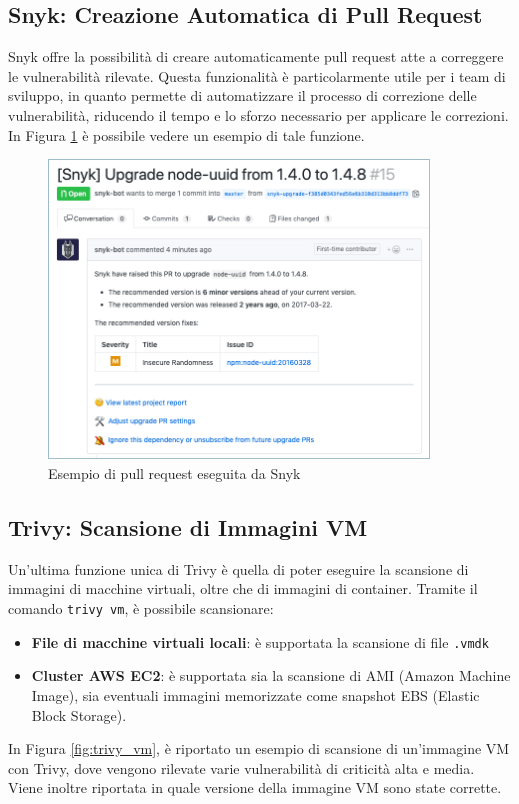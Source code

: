 \subsection{Snyk: Creazione Automatica di Pull Request}
Snyk offre la possibilità di creare automaticamente pull request atte a correggere le vulnerabilità rilevate. Questa funzionalità è particolarmente utile per i team di sviluppo, in quanto permette di automatizzare il processo di correzione delle vulnerabilità, riducendo il tempo e lo sforzo necessario per applicare le correzioni. In Figura \ref{fig:snyk_pr} è possibile vedere un esempio di tale funzione.
\begin{figure}[H]
   \centering
   \includegraphics[width=0.9\textwidth]{immagini/capitolo2/snyk_pr.png}
   \caption{Esempio di pull request eseguita da Snyk}
   \label{fig:snyk_pr}
\end{figure}

\subsection{Trivy: Scansione di Immagini VM}
Un'ultima funzione unica di Trivy è quella di poter eseguire la scansione di immagini di macchine virtuali, oltre che di immagini di container. Tramite il comando \texttt{trivy vm}, è possibile scansionare:
\begin{itemize}
   \item\textbf{File di macchine virtuali locali}: è supportata la scansione di file \texttt{.vmdk}
   \item\textbf{Cluster AWS EC2}: è supportata sia la scansione di AMI (Amazon Machine Image), sia eventuali immagini memorizzate come snapshot EBS (Elastic Block Storage).
\end{itemize}
In Figura \ref{fig:trivy_vm}, è riportato un esempio di scansione di un'immagine VM con Trivy, dove vengono rilevate varie vulnerabilità di criticità alta e media. Viene inoltre riportata in quale versione della immagine VM sono state corrette.

